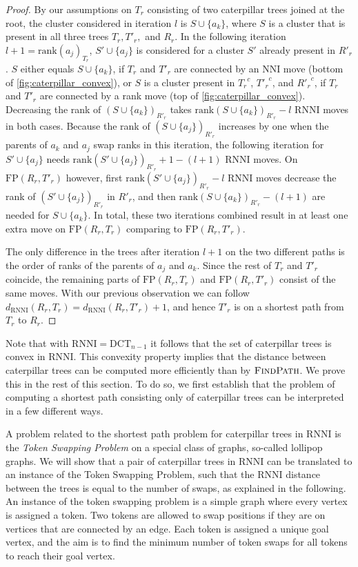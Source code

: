 \documentclass[11pt]{amsart}
\newcommand{\rnni}{\mathrm{RNNI}}
\newcommand{\findpath}{\textsc{FindPath}}
\newcommand{\rank}{\mathrm{rank}}
\newcommand{\nni}{\mathrm{NNI}}
\newcommand{\fp}{\mathrm{FP}}
\newcommand{\dct}{\mathrm{DCT}}
\begin{document}
\begin{proof}
	By our assumptions on $T_r$ consisting of two caterpillar trees joined at the root, the cluster considered in iteration $l$ is $S \cup \{a_k\}$, where $S$ is a cluster that is present in all three trees $T_r, T'_r,$ and $R_r$.
	In the following iteration $l+1 = \rank(a_j)_{T_r}$, $S' \cup \{a_j\}$ is considered for a cluster $S'$ already present in $R'_r$.
	$S$ either equals $S \cup \{a_k\}$, if $T_r$ and $T'_r$ are connected by an $\nni$ move (bottom of \autoref{fig:caterpillar_convex}), or $S$ is a cluster present in ${T_r}^c$, ${T'_r}^c$, and ${R'_r}^c$, if $T_r$ and $T'_r$ are connected by a rank move (top of \autoref{fig:caterpillar_convex}).
	Decreasing the rank of $(S \cup \{a_k\})_{R'_r}$ takes $\rank(S \cup \{a_k\})_{R'_r} - l$ $\rnni$ moves in both cases.
	Because the rank of $(S \cup \{a_j\})_{R'_r}$ increases by one when the parents of $a_k$ and $a_j$ swap ranks in this iteration, the following iteration for $S' \cup \{a_j\}$ needs $\rank(S' \cup \{a_j\})_{R'_r} + 1 - (l+1)$ $\rnni$ moves.
	On $\fp(R_r,T'_r)$ however, first $\rank(S' \cup \{a_j\})_{R'_r} - l$ $\rnni$ moves decrease the rank of $(S' \cup \{a_j\})_{R'_r}$ in $R'_r$, and then $\rank(S \cup \{a_k\})_{R'_r} - (l+1)$ are needed for $S \cup \{a_k\}$.
	In total, these two iterations combined result in at least one extra move on $\fp(R_r, T_r)$ comparing to $\fp(R_r, T'_r)$.

	The only difference in the trees after iteration $l+1$ on the two different paths is the order of ranks of the parents of $a_j$ and $a_k$.
	Since the rest of $T_r$ and $T'_r$ coincide, the remaining parts of $\fp(R_r, T_r)$ and $\fp(R_r, T'_r)$ consist of the same moves.
	With our previous observation we can follow $d_{\rnni}(R_r,T_r) = d_{\rnni}(R_r,T'_r) + 1$, and hence $T'_r$ is on a shortest path from $T_r$ to $R_r$.
\end{proof}

Note that with $\rnni = \dct_{n-1}$ it follows that the set of caterpillar trees is convex in $\rnni$.
This convexity property implies that the distance between caterpillar trees can be computed more efficiently than by $\findpath$.
We prove this in the rest of this section.
To do so, we first establish that the problem of computing a shortest path consisting only of caterpillar trees can be interpreted in a few different ways.

A problem related to the shortest path problem for caterpillar trees in $\rnni$ is the \emph{Token Swapping Problem} \autocite{Kawahara2017-ey} on a special class of graphs, so-called lollipop graphs.
We will show that a pair of caterpillar trees in $\rnni$ can be translated to an instance of the Token Swapping Problem, such that the $\rnni$ distance between the trees is equal to the number of swaps, as explained in the following.
An instance of the token swapping problem is a simple graph where every vertex is assigned a token.
Two tokens are allowed to swap positions if they are on vertices that are connected by an edge.
Each token is assigned a unique goal vertex, and the aim is to find the minimum number of token swaps for all tokens to reach their goal vertex.
\end{document}
